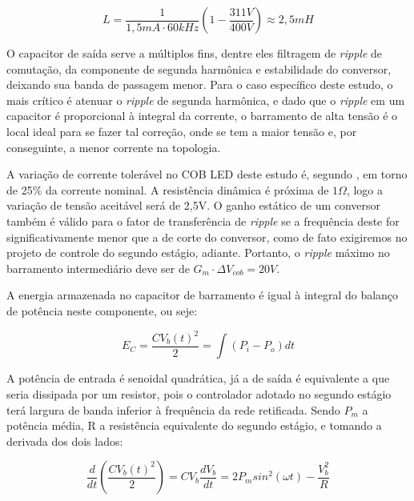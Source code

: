 \documentclass[
        12pt,
        openany, %
        oneside, %
        a4paper,			
        english,			
        brazil
        ]{abntbibufjf}
\begin{document}

\begin{equation}
L = \frac{1}{1,5mA \cdot 60kHz}\left (  1-\frac{311V}{400V}\right ) \approx 2,5 mH
\end{equation}


O capacitor de saída serve a múltiplos fins, dentre eles filtragem de \textit{ripple} de comutação, da componente de segunda harmônica e estabilidade do conversor, deixando sua banda de passagem menor. Para o caso específico deste estudo, o mais crítico é atenuar o \textit{ripple} de segunda harmônica, e dado que o \textit{ripple} em um capacitor é proporcional à integral da corrente, o barramento de alta tensão é o local ideal para se fazer tal correção, onde se tem a maior tensão e, por conseguinte, a menor corrente na topologia.

A variação de corrente tolerável no COB LED deste estudo é, segundo \cite{denis}, em torno de 25\% da corrente nominal. A resistência dinâmica é próxima de $1\Omega$, logo a variação de tensão aceitável será de 2,5V. O ganho estático de um conversor também é válido para o fator de transferência de \textit{ripple} se a frequência deste for significativamente menor que a de corte do conversor, como de fato exigiremos no projeto de controle do segundo estágio, adiante. Portanto, o \textit{ripple} máximo no barramento intermediário deve ser de $G_m \cdot \Delta V_{cob} = 20V$.

A energia armazenada no capacitor de barramento é igual à integral do balanço de potência neste componente, ou seje:

\begin{equation}
E_C=\frac{CV_b(t)^2}{2}=\int (P_i-P_o)dt
\end{equation}

A potência de entrada é senoidal quadrática, já a de saída é equivalente a que seria dissipada por um resistor, pois o controlador adotado no segundo estágio terá largura de banda inferior à frequência da rede retificada. Sendo $P_m$ a potência média, R a resistência equivalente do segundo estágio, e tomando a derivada dos dois lados:

\begin{equation}
\frac{d}{dt}\left ( \frac{CV_b(t)^2}{2}\right )=CV_b\frac{dV_b}{dt}=2P_msin^2(\omega t)-\frac{V_b^2}{R}
\end{equation}
\end{document}
